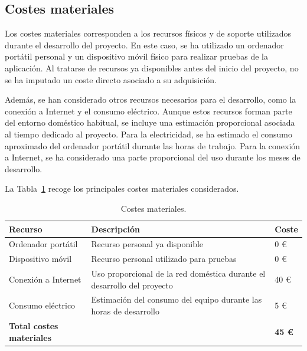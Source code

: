 \subsection{Costes materiales}

Los costes materiales corresponden a los recursos físicos y de soporte utilizados durante el desarrollo del proyecto. En este caso, se ha utilizado un ordenador portátil personal y un dispositivo móvil físico para realizar pruebas de la aplicación. Al tratarse de recursos ya disponibles antes del inicio del proyecto, no se ha imputado un coste directo asociado a su adquisición.

Además, se han considerado otros recursos necesarios para el desarrollo, como la conexión a Internet y el consumo eléctrico. Aunque estos recursos forman parte del entorno doméstico habitual, se incluye una estimación proporcional asociada al tiempo dedicado al proyecto. Para la electricidad, se ha estimado el consumo aproximado del ordenador portátil durante las horas de trabajo. Para la conexión a Internet, se ha considerado una parte proporcional del uso durante los meses de desarrollo.

La Tabla~\ref{tab:costes_materiales} recoge los principales costes materiales considerados.

\begin{table}[H]
\centering
\caption{Costes materiales.}
\label{tab:costes_materiales}
\renewcommand{\arraystretch}{1.2}
\begin{tabular}{|p{6cm}|p{5cm}|p{3cm}|}
\hline
\textbf{Recurso} & \textbf{Descripción} & \textbf{Coste} \\ \hline

Ordenador portátil &
Recurso personal ya disponible &
0 \euro \\ \hline

Dispositivo móvil &
Recurso personal utilizado para pruebas &
0 \euro \\ \hline

Conexión a Internet &
Uso proporcional de la red doméstica durante el desarrollo del proyecto &
40 \euro \\ \hline

Consumo eléctrico &
Estimación del consumo del equipo durante las horas de desarrollo &
5 \euro \\ \hline

\textbf{Total costes materiales} &
&
\textbf{45 \euro} \\ \hline

\end{tabular}
\end{table}

